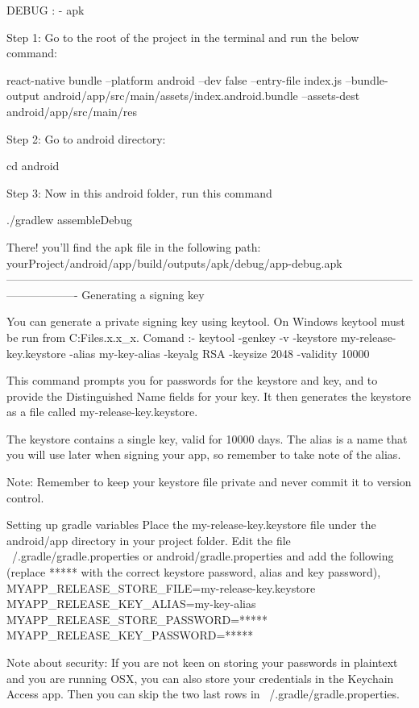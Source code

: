 DEBUG : - apk

Step 1: Go to the root of the project in the terminal and run the below command:

react-native bundle --platform android --dev false --entry-file index.js --bundle-output 
android/app/src/main/assets/index.android.bundle --assets-dest android/app/src/main/res

Step 2: Go to android directory:

cd android

Step 3: Now in this android folder, run this command

./gradlew assembleDebug

There! you’ll find the apk file in the following path:
yourProject/android/app/build/outputs/apk/debug/app-debug.apk
-------------------------------------------------------------------------------------------------------------------------------
Generating a signing key

You can generate a private signing key using keytool. On Windows keytool must be run from C:\Program Files\Java\jdkx.x.x_x\bin.
Comand :-  keytool -genkey -v -keystore my-release-key.keystore -alias my-key-alias -keyalg RSA -keysize 2048 -validity 10000

This command prompts you for passwords for the keystore and key, and to provide the Distinguished Name fields for your key. It then generates the keystore as a file called my-release-key.keystore.

The keystore contains a single key, valid for 10000 days. The alias is a name that you will use later when signing your app, so remember to take note of the alias.

Note: Remember to keep your keystore file private and never commit it to version control.

Setting up gradle variables
Place the my-release-key.keystore file under the android/app directory in your project folder.
Edit the file ~/.gradle/gradle.properties or android/gradle.properties and add the following (replace ***** with the correct keystore password, alias and key password),
MYAPP_RELEASE_STORE_FILE=my-release-key.keystore
MYAPP_RELEASE_KEY_ALIAS=my-key-alias
MYAPP_RELEASE_STORE_PASSWORD=*****
MYAPP_RELEASE_KEY_PASSWORD=*****

Note about security: If you are not keen on storing your passwords in plaintext and you are running OSX, you can also store your credentials in the Keychain Access app. Then you can skip the two last rows in ~/.gradle/gradle.properties.

